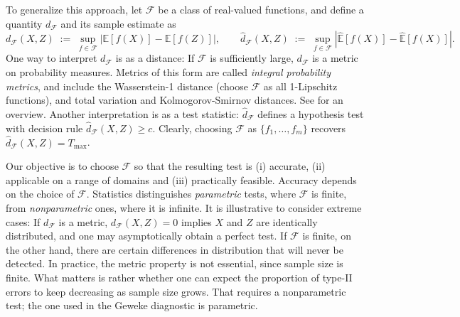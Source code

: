 \documentclass{article}
\begin{document}
To generalize this approach, let $\mathcal{F}$ be a
class of real-valued functions, and define a
quantity $d_\mathcal{F}$ and its sample estimate as
\begin{equation}
  d_{\mathcal{F}}(X,Z)\;:=\;\sup_{f\in\mathcal{F}}|\mathbb{E}[f(X)]-\mathbb{E}[f(Z)]|,\qquad
    \hat{d}_\mathcal{F}(X,Z)\;:=\;
    \sup_{f\in\mathcal{F}}|\hat{\mathbb{E}}[f(X)]-\hat{\mathbb{E}}[f(X)]|.
      \label{eq:naive-IPM}
\end{equation}
One way to interpret $d_\mathcal{F}$ is as a distance:
If $\mathcal{F}$ is sufficiently large, $d_\mathcal{F}$ is a
metric on probability measures. Metrics of this form are called
\emph{integral probability metrics}, and include the Wasserstein-1
distance (choose $\mathcal{F}$ as all 1-Lipschitz functions),
and total variation and Kolmogorov-Smirnov distances. See \cite{mueller:1997} for an overview.
Another interpretation is as a test statistic:
$\hat{d}_\mathcal{F}$ defines a hypothesis test with decision rule 
${\hat{d}_\mathcal{F}(X,Z)\geq c}$. Clearly, choosing
$\mathcal{F}$ as ${\{f_1,\ldots,f_m\}}$ recovers ${\hat{d}_\mathcal{F}(X,Z)=T_{\text{max}}}$.


Our objective is to choose $\mathcal{F}$ so that the resulting test is
(i) accurate, (ii) applicable on a range of
domains and (iii) practically feasible.
Accuracy depends on the choice of $\mathcal{F}$.
Statistics distinguishes \emph{parametric} tests, where $\mathcal{F}$ is
finite, from \emph{nonparametric} ones, where it is
infinite. It is illustrative to
consider extreme cases: If $d_\mathcal{F}$ is a metric,
${d_\mathcal{F}(X,Z)=0}$ implies $X$ and $Z$ are
identically distributed, and one may asymptotically obtain a perfect test.
If $\mathcal{F}$ is finite, on the other hand, 
there are certain differences in distribution that will never be detected. 
In practice, the metric property is not essential, since sample size
is finite. What matters is rather whether one can expect the
proportion of type-II errors
to keep decreasing as sample size grows. That requires a nonparametric test;
the one used in the Geweke diagnostic is parametric.
\end{document}
